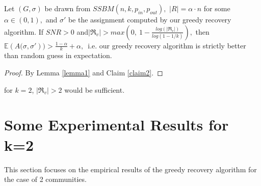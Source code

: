 \begin{corollary}
     Let $(G, \sigma)$ be drawn from $SSBM(n, k, p_{in}, p_{out}),$ $|R|=\alpha\cdot n$ for some $\alpha\in(0,1),$ and $\sigma'$ be the assignment computed by our greedy recovery algorithm. If $SNR>0$ and$|\Re_v|>max(0,~1-\frac{log(|\Re_v|)}{log(1-1/k)}),$ then $\mathbb{E}({A(\sigma, \sigma'}))>\frac{1-\alpha}{k}+\alpha,$~i.e. our greedy recovery algorithm is strictly better than random guess in expectation.
\end{corollary}
\begin{proof}
    By Lemma \ref{lemma1} and Claim \ref{claim2}.
\end{proof}
\begin{remark}
    for $k=2$, $|\Re_v|>2$ would be sufficient.
\end{remark}
\section{Some Experimental Results for k=2}
This section focuses on the empirical results of the greedy recovery algorithm for the case of 2 communities.
